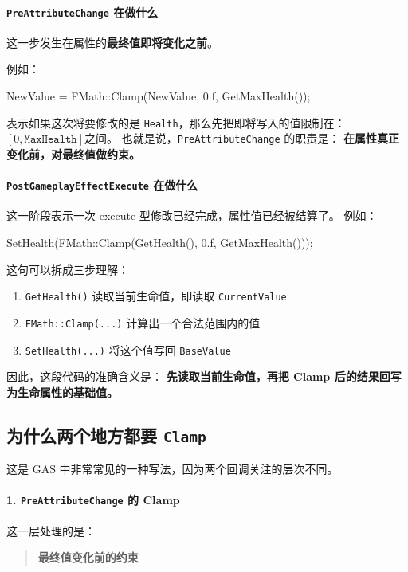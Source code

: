 \paragraph{\texttt{PreAttributeChange} 在做什么}
这一步发生在属性的\textbf{最终值即将变化之前}。

例如：

\begin{code}[language=C++]
	NewValue = FMath::Clamp(NewValue, 0.f, GetMaxHealth());
\end{code}

表示如果这次将要修改的是 \texttt{Health}，那么先把即将写入的值限制在：
$
[0, \texttt{MaxHealth}]
$之间。
也就是说，\texttt{PreAttributeChange} 的职责是：
\textbf{在属性真正变化前，对最终值做约束。}

\paragraph{\texttt{PostGameplayEffectExecute} 在做什么}
这一阶段表示一次 execute 型修改已经完成，属性值已经被结算了。
例如：
\begin{code}[language=C++]
	SetHealth(FMath::Clamp(GetHealth(), 0.f, GetMaxHealth()));
\end{code}

这句可以拆成三步理解：
\begin{enumerate}
	\item \texttt{GetHealth()} 读取当前生命值，即读取 \texttt{CurrentValue}
	\item \texttt{FMath::Clamp(...)} 计算出一个合法范围内的值
	\item \texttt{SetHealth(...)} 将这个值写回 \texttt{BaseValue}
\end{enumerate}

因此，这段代码的准确含义是：	\textbf{先读取当前生命值，再把 Clamp 后的结果回写为生命属性的基础值。}

\subsection{为什么两个地方都要 \texttt{Clamp}}

这是 GAS 中非常常见的一种写法，因为两个回调关注的层次不同。

\paragraph{1. \texttt{PreAttributeChange} 的 Clamp}
这一层处理的是：

\begin{quote}
	\textbf{最终值变化前的约束}
\end{quote}

